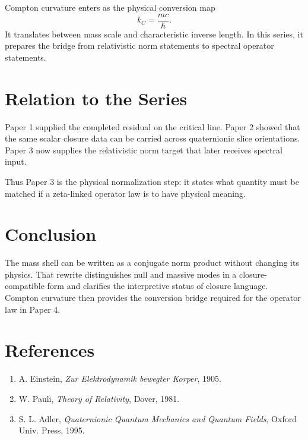 \documentclass[11pt]{article}
\begin{document}
Compton curvature enters as the physical conversion map
\[
k_C=\frac{mc}{\hbar}.
\]
It translates between mass scale and characteristic inverse length. In this series, it prepares the bridge from relativistic norm statements to spectral operator statements.

\section{Relation to the Series}
Paper 1 supplied the completed residual on the critical line. Paper 2 showed that the same scalar closure data can be carried across quaternionic slice orientations. Paper 3 now supplies the relativistic norm target that later receives spectral input.

Thus Paper 3 is the physical normalization step: it states what quantity must be matched if a zeta-linked operator law is to have physical meaning.

\section{Conclusion}
The mass shell can be written as a conjugate norm product without changing its physics. That rewrite distinguishes null and massive modes in a closure-compatible form and clarifies the interpretive status of closure language. Compton curvature then provides the conversion bridge required for the operator law in Paper 4.

\section*{References}
\begin{enumerate}
\item A. Einstein, \emph{Zur Elektrodynamik bewegter Korper}, 1905.
\item W. Pauli, \emph{Theory of Relativity}, Dover, 1981.
\item S. L. Adler, \emph{Quaternionic Quantum Mechanics and Quantum Fields}, Oxford Univ. Press, 1995.
\end{enumerate}
\end{document}
